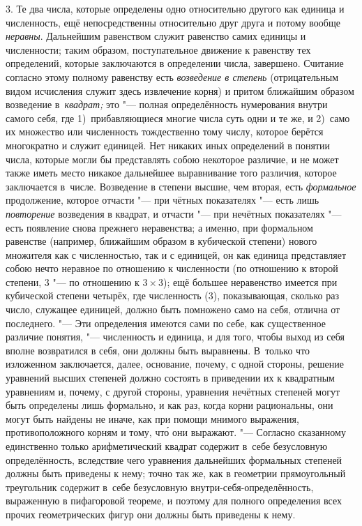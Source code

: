 3. Те два числа, которые определены одно относительно другого как единица и
численность, ещё непосредственны относительно друг друга и потому вообще {\em
неравны}. Дальнейшим равенством служит равенство самих единицы и численности;
таким образом, поступательное движение к равенству тех определений, которые
заключаются в определении числа, завершено. Считание согласно этому полному
равенству есть {\em возведение в степень} (отрицательным видом исчисления
служит здесь извлечение корня) и притом ближайшим образом возведение
в~{\em квадрат;} это "--- полная определённость нумерования внутри самого
себя, где 1)~прибавляющиеся многие числа суть одни и те же, и 2)~само
их множество или численность тождественно тому числу, которое берётся
многократно и служит единицей. Нет никаких иных определений в понятии числа,
которые могли бы представлять собою некоторое различие, и не может также иметь
место никакое дальнейшее выравнивание того различия, которое заключается
в~числе. Возведение в степени высшие, чем вторая, есть {\em формальное}
продолжение, которое отчасти "--- при чётных показателях "--- есть лишь
{\em повторение} возведения в квадрат, и отчасти "--- при нечётных показателях
"--- есть появление снова прежнего неравенства; а именно, при формальном
равенстве (например, ближайшим образом в кубической степени) нового множителя
как с численностью, так и с единицей, он как единица представляет собою нечто
неравное по отношению к численности (по отношению к второй степени, 3 "--- по
отношению к $3\times 3$); ещё большее неравенство имеется при кубической
степени четырёх, где численность (3), показывающая, сколько раз число, служащее
единицей, должно быть помножено само на себя, отлична от последнего. "--- Эти
определения имеются сами по себе, как существенное различие понятия, "---
численность и единица, и для того, чтобы выход из себя вполне возвратился в
себя, они должны быть выравнены. В~только что изложенном заключается, далее,
основание, почему, с одной стороны, решение уравнений высших степеней должно
состоять в приведении их к квадратным уравнениям и, почему, с другой стороны,
уравнения нечётных степеней могут быть определены лишь формально, и как раз,
когда корни рациональны, они могут быть найдены не иначе, как при помощи мнимого
выражения, противоположного корням и тому, чт\'{о} они выражают. "--- Согласно
сказанному единственно только арифметический квадрат
содержит в~себе безусловную определённость, вследствие чего уравнения дальнейших
формальных степеней должны быть приведены к нему; точно так же, как в геометрии
прямоугольный треугольник содержит в~себе безусловную внутри-себя-определённость,
выраженную в пифагоровой теореме, и поэтому для полного определения всех прочих
геометрических фигур они должны быть приведены к нему.

